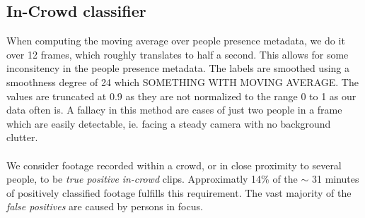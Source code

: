 \subsection{In-Crowd classifier}
%
When computing the moving average over people presence metadata, we do it over 12 frames, which roughly translates to half a second. This allows for some inconsitency in the people presence metadata. The labels are smoothed using a smoothness degree of 24 which SOMETHING WITH MOVING AVERAGE. The values are truncated at 0.9 as they are not normalized to the range 0 to 1 as our data often is.
%
A fallacy in this method are cases of just two people in a frame which are easily detectable, ie. facing a steady camera with no background clutter.\\
\\
We consider footage recorded within a crowd, or in close proximity to several people, to be \textit{true positive} \textit{in-crowd} clips. Approximatly 14\% of the $\sim$ 31 minutes of positively classified footage fulfills this requirement. The vast majority of the \textit{false positives} are caused by persons in focus.
%
%
%
